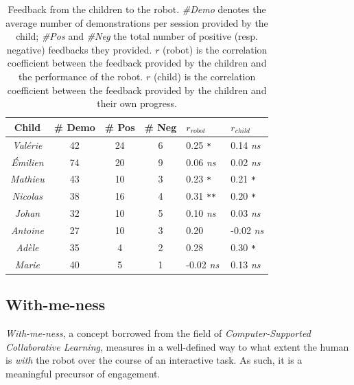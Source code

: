 \documentclass[10pt,a4paper]{article}
\begin{document}
\begin{table}
    \centering
    \caption{\footnotesize Feedback from the children to the robot. \emph{\#Demo}
        denotes the average number of demonstrations per session provided by the child;
        \emph{\#Pos} and \emph{\#Neg} the total number of positive (resp.
        negative) feedbacks they provided. $r$ (robot) is the correlation coefficient
        between the feedback provided by the children and the performance of the
        robot. $r$ (child) is the correlation coefficient
        between the feedback provided by the children and their own progress.
        }
    \begin{tabular}{ccccll}
        \toprule
        \bf Child      & \bf \# Demo & \bf \# Pos & \bf \# Neg & $r_{robot}$ & $r_{child}$ \\ \midrule
        \emph{Val\'erie} & 42           & 24              & 6               & 0.25 \small\tt ** & 0.14 \small\it ns\\ 
        \emph{\'Emilien} & 74           & 20              & 9               & 0.06 \small\it ns & 0.02 \small\it ns\\
        \emph{Mathieu} & 43           & 10              & 3               & 0.23 \small\tt ** & 0.21 \small\tt **\\
        \emph{Nicolas} & 38           & 16              & 4               & 0.31 \small\tt *** & 0.20 \small\tt **\\
        \emph{Johan}   & 32           & 10              & 5               & 0.10 \small\it ns & 0.03 \small\it ns\\
        \emph{Antoine} & 27           & 10              & 3               & 0.20 \small\tt * & -0.02 \small\it ns \\
        \emph{Ad\`ele}   & 35           & 4               & 2               & 0.28 \small\tt * & 0.30 \small\tt ** \\
        \emph{Marie}   & 40           & 5               & 1               & -0.02 \small\it ns & 0.13 \small\it ns\\ \bottomrule
    \end{tabular}

    \label{table:scores}
\end{table}


\subsection{With-me-ness}\label{with}
\emph{With-me-ness}, a concept borrowed from the
field of {\it Computer-Supported Collaborative Learning}, measures in a
well-defined way to what extent the human is \emph{with} the robot over the
course of an interactive task. As such, it is a meaningful precursor of
engagement. 
\end{document}
